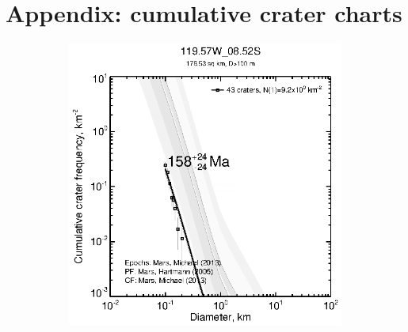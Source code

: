 \documentclass[12pt,letter]{article}
\begin{document}






\section{Appendix: cumulative crater charts}\label{sec_cccharts}
\begin{figure}[h]
\centering
\begin{subfigure}{.33\textwidth}
  \includegraphics[width=\linewidth,clip,trim=1cm 1cm 1.5cm 1cm]{figures/craterstats/119-57W_08-52S_100m_cum.eps}
\end{subfigure}%
\begin{subfigure}{.33\textwidth}

\end{subfigure}
\end{figure}
\end{document}
